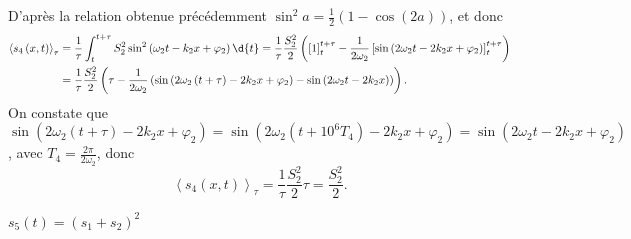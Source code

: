 	\begin{corrige}
		D'après la relation obtenue précédemment $\sin^2 a = \frac{1}{2}\left( 1 - \cos\left( 2a \right) \right)$, et donc
		\begin{align*}
			\left< s_4\left( x,t \right) \right>_{\tau} &= \frac{1}{\tau} \int_t^{t+\tau} S_2^2 \sin^2 \left( \omega_2 t - k_2 x +\varphi_2\right) \d{t} = \frac{1}{\tau} \frac{S_2^2}{2} \left(\left[1\right]^{t+\tau}_{t} - \frac{1}{2\omega_2}\left[\sin\left( 2 \omega_2 t - 2 k_2 x +\varphi_2 \right)\right]^{t+\tau}_{t} \right)\\
			&= \frac{1}{\tau} \frac{S_2^2}{2} \left(\tau - \frac{1}{2\omega_2}\left(\sin\left( 2 \omega_2 \left(t+\tau\right) - 2 k_2 x +\varphi_2 \right)-\sin\left( 2 \omega_2 t - 2 k_2 x \right)\right)\right).
		\end{align*}
		On constate que $\sin\left( 2 \omega_2 \left(t+\tau\right) - 2 k_2 x +\varphi_2\right) = \sin\left( 2 \omega_2 \left( t+10^6T_4 \right) - 2 k_2 x +\varphi_2 \right) = \sin\left( 2 \omega_2 t - 2 k_2 x +\varphi_2 \right)$, avec $T_4=\frac{2\pi}{2\omega_2}$, donc
		$$
		\left< s_4\left( x,t \right) \right>_{\tau} = \frac{1}{\tau} \frac{S_2^2}{2} \tau = \frac{S_2^2}{2}.
		$$
	\end{corrige}
	



\begin{enonce}
$s_5\left( t \right) = \left( s_1 + s_2 \right)^2 $
\end{enonce}
			
			
